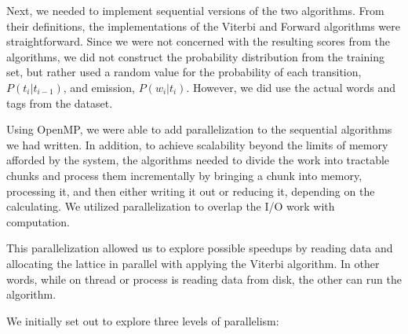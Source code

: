 \documentclass[11pt,onecolumn]{article}
\begin{document}

Next, we needed to implement sequential versions of the two algorithms. From their definitions, the implementations of the Viterbi and Forward algorithms were straightforward. Since we were not concerned with the resulting scores from the algorithms, we did not construct the probability distribution from the training set, but rather used a random value for the probability of each transition, $P(t_{i}|t_{i-1})$, and emission, $P(w_i|t_i)$. However, we did use the actual words and tags from the dataset.


Using OpenMP, we were able to add parallelization to the sequential algorithms we had written. In addition, to achieve scalability beyond the limits of memory afforded by the system, the algorithms needed to divide the work into tractable chunks and process them incrementally by bringing a chunk into memory, processing it, and then either writing it out or reducing it, depending on the calculating. We utilized parallelization to overlap the I/O work with computation. 

This parallelization allowed us to explore possible speedups by reading data and allocating the lattice in parallel with applying the Viterbi algorithm. In other words, while on thread or process is reading data from disk, the other can run the algorithm.

We initially set out to explore three levels of parallelism:
\end{document}
